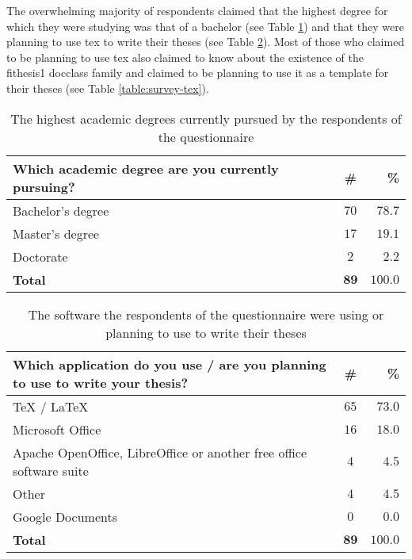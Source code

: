 \documentclass[12pt,twoside,cover,color,table]%
  {fithesis3/fithesis3/fithesis3} %
\begin{document}
  The overwhelming majority of respondents claimed that the highest
  degree for which they were studying was that of a bachelor (see
  Table \ref{table:survey-type}) and that they were planning to use
  \gls{tex} to write their theses (see Table
  \ref{table:survey-sw}). Most of those who claimed to be planning
  to use \gls{tex} also claimed to know about the existence of the
  \textsf{fithesis1} \gls{docclass} family and claimed to be
  planning to use it as a template for their theses (see Table
  \ref{table:survey-tex}).

  \begin{table}
    \caption{The highest academic degrees currently pursued by the
      respondents of the questionnaire}
    \begin{tabularx}{\textwidth}{Xcr}
      \textbf{Which academic degree are you currently pursuing?} &
      \textbf{\#} & \textbf{\%} \\
      \toprule
      Bachelor's degree  & $70$          & $78.7$ \\
      Master's degree    & $17$          & $19.1$ \\
      Doctorate          & $2$           & $2.2$  \\
      \bottomrule
      \textbf{Total}     & $\mathbf{89}$ & $\mathbf{100.0}$
    \end{tabularx}
    \label{table:survey-type}
  \end{table}

  \begin{table}
    \caption{The software the respondents of the questionnaire
      were using or planning to use to write their theses}
    \begin{tabularx}{\textwidth}{Xcr}
      \textbf{Which application do you use / are you planning to
      use to write your thesis?} & \textbf{\#} & \textbf{\%} \\
      \toprule
      \TeX{ / \LaTeX{}}     & $65$          & $73.0$ \\
      Microsoft Office      & $16$          & $18.0$ \\
      Apache OpenOffice, LibreOffice or another free office
      software suite        & $4$           &  $4.5$ \\
      Other                 & $4$           &  $4.5$ \\
      Google Documents      & $0$           &  $0.0$ \\
      \bottomrule
      \textbf{Total}        & $\mathbf{89}$ & $\mathbf{100.0}$
    \end{tabularx}
    \label{table:survey-sw}
  \end{table}
\end{document}
